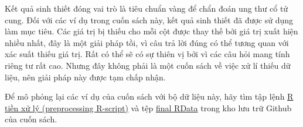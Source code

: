 Kết quả sinh thiết đóng vai trò là tiêu chuẩn vàng để chẩn đoán ung thư cổ tử cung. Đối với các ví dụ trong cuốn sách này, kết quả sinh thiết đã được sử dụng làm mục tiêu. Các giá trị bị thiếu cho mỗi cột được thay thế bởi giá trị xuất hiện nhiều nhất, đây là một giải pháp tồi, vì câu trả lời đúng có thể tương quan với xác suất thiếu giá trị. Rất có thể sẽ có sự thiên vị bởi vì các câu hỏi mang tính riêng tư rất cao. Nhưng đây không phải là một cuốn sách về việc xử lí thiếu dữ liệu, nên giải pháp  này được tạm chấp nhận.

Để mô phỏng lại các ví dụ của cuốn sách với bộ dữ liệu này, hãy tìm tập lệnh \href{https://github.com/christophM/interpretable-ml-book/blob/master/R/get-cervical-cancer-dataset.R}{R tiền xử lý (preprocessing R-script)}  và tệp \href{https://github.com/christophM/interpretable-ml-book/blob/master/data/cervical.RData}{final RData} trong kho lưu trữ Github của cuốn sách.
